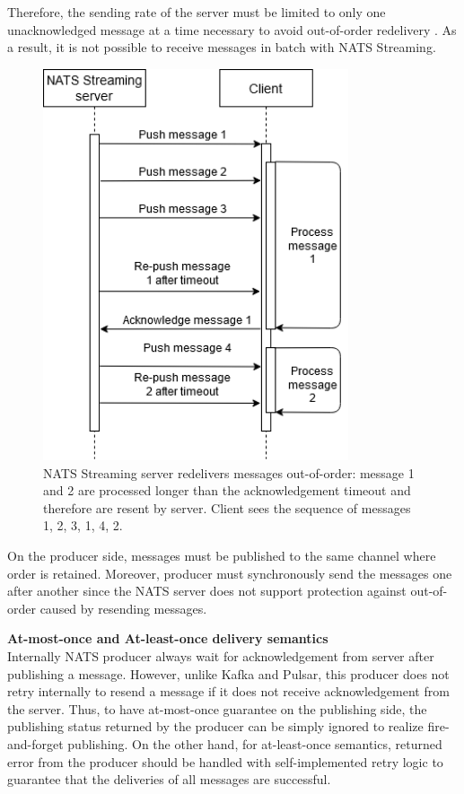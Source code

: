 Therefore, the sending rate of the server must be limited to only one unacknowledged message at a time necessary to avoid out-of-order redelivery \cite{natsdevelopingacks}. As a result, it is not possible to receive messages in batch with NATS Streaming. 

\begin{figure}[h]
	\centering
	\includegraphics[width=9cm]{images/order-nats.png}
	\caption{NATS Streaming server redelivers messages out-of-order: message 1 and 2 are processed longer than the acknowledgement timeout and therefore are resent by server. Client sees the sequence of messages 1, 2, 3, 1, 4, 2.}
	\label{fig:ordernats}
\end{figure}

On the producer side, messages must be published to the same channel where order is retained. Moreover, producer must synchronously send the messages one after another since the NATS server does not support protection against out-of-order caused by resending messages.  

\textbf{At-most-once and At-least-once delivery semantics}\\
Internally NATS producer always wait for acknowledgement from server after publishing a message. However, unlike Kafka and Pulsar, this producer does not retry internally to resend a message if it does not receive acknowledgement from the server. Thus, to have at-most-once guarantee on the publishing side, the publishing status returned by the producer can be simply ignored to realize fire-and-forget publishing. On the other hand, for at-least-once semantics, returned error from the producer should be handled with self-implemented retry logic to guarantee that the deliveries of all messages are successful.

